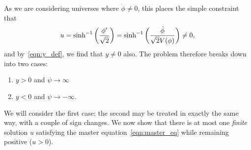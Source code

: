 As we are considering universes where $\dot{\phi}\ne 0$, this places the simple constraint that 
%
\begin{equation}
  u 
  = 
  \sinh^{-1}\left(\frac{{{\phi}^\prime}}{\sqrt 2}\right) 
  = 
  \sinh^{-1}\left(\frac{\dot\phi}{\sqrt 2 V(\phi)}\right)
  \ne 
  0,
\end{equation}
%
and by~\eqref{eqn:y_def}, we find that $y\ne0$ also.  The problem therefore breaks down into two cases: 
%
\begin{enumerate}
  \item $y>0$ and $\psi\rightarrow\infty$
  \item $y<0$ and $\psi\rightarrow -\infty$.
\end{enumerate}
%
We will consider the first case; the second may be treated in exactly the same way, with a couple of sign changes.  We now show that there is at most one {\em finite\/} solution $u$ satisfying the master equation~\eqref{eqn:master_eq} while remaining positive ($u>0$).

